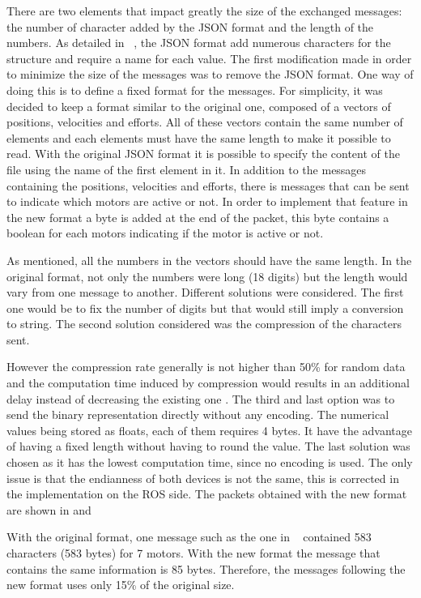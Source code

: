 There are two elements that impact greatly the size of the exchanged messages: the number of character added by the JSON format and the length of the numbers.
As detailed in ~, the JSON format add numerous characters for the structure and require a name for each value. The first modification made in order to minimize the size of the messages was to remove the JSON format. One way of doing this is to define a fixed format for the messages. For simplicity, it was decided to keep a format similar to the original one, composed of a vectors of positions, velocities and efforts. All of these vectors contain the same number of elements and each elements must have the same length to make it possible to read. 
With the original \gls{JSON} format it is possible to specify the content of the file using the name of the first element in it. In addition to the messages containing the positions, velocities and efforts, there is messages that can be sent to indicate which motors are active or not. In order to implement that feature in the new format a byte is added at the end of the packet, this byte contains a boolean for each motors indicating if the motor is active or not.

As mentioned, all the numbers in the vectors should have the same length. In the original format, not only the numbers were long (18 digits) but the length would vary from one message to another. Different solutions were considered. The first one would be to fix the number of digits but that would still imply a conversion to string. The second solution considered was the compression of the characters sent. 

 However the compression rate generally is not higher than 50\% for random data and the computation time induced by compression would results in an additional delay instead of decreasing the existing one \cite{simple_compression}\cite{fast_ZIV}. The third and last option was to send the binary representation directly without any encoding. The numerical values being stored as floats, each of them requires 4 bytes. It have the advantage of having a fixed length without having to round the value. The last solution was chosen as it has the lowest computation time, since no encoding is used. The only issue is that the endianness of both devices is not the same, this is corrected in the implementation on the ROS side. The packets obtained with the new format are shown in  and 

With the original format, one message such as the one in ~ contained 583 characters (583 bytes) for 7 motors. With the new format the message that contains the same information is 85 bytes. Therefore, the messages following the new format uses only 15\% of the original size.

